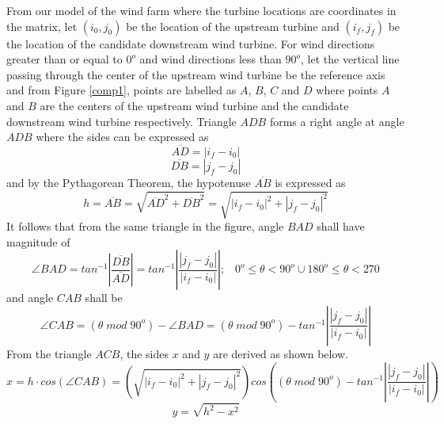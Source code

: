     From our model of the wind farm where the turbine locations are coordinates in the matrix, let $(i_0,j_0)$ be the location of the upstream turbine and $(i_f,j_f)$ be the location of the candidate downstream wind turbine. For wind directions greater than or equal to $0^o$ and wind directions less than $90^o$, let the vertical line passing through the center of the upstream wind turbine be the reference axis and from Figure \ref{comp1}, points are labelled as $A$, $B$, $C$ and $D$ where points $A$ and $B$ are the centers of the upstream wind turbine and the candidate downstream wind turbine respectively. Triangle $ADB$ forms a right angle at angle $ADB$ where the sides can be expressed as
    \begin{equation}
        \overline{AD} = \left| i_f-i_0 \right|
    \end{equation}
    \begin{equation}
        \overline{DB} = \left| j_f-j_0 \right|
    \end{equation}
    and by the Pythagorean Theorem, the hypotenuse $\overline{AB}$ is expressed as
    \begin{equation}
        h=\overline{AB} = \sqrt{\overline{AD}^2+\overline{DB}^2}=
                        \sqrt{\left| i_f-i_0 \right|^2+\left| j_f-j_0 \right|^2}
    \end{equation}
    It follows that from the same triangle in the figure, angle $BAD$ shall have magnitude of
    \begin{equation}
        \angle BAD = tan^{-1}\left| \frac{\overline{DB}}{\overline{AD}} \right|
                    = tan^{-1}\left| \frac{\left| j_f-j_0 \right|}{\left| i_f-i_0 \right|} \right|;
                    \;\;\; 0^o\leq\theta<90^o\cup180^o\leq\theta<270
    \end{equation}
    and angle $CAB$ shall be
    \begin{equation}
        \angle CAB = \left( \theta \;mod\; 90^o \right)-\angle BAD
                    = \left( \theta \;mod\; 90^o \right)-tan^{-1}\left| \frac{\left| j_f-j_0 \right|}{\left| i_f-i_0 \right|} \right|
    \end{equation}
    From the triangle $ACB$, the sides $x$ and $y$ are derived as shown below.
    \begin{equation} \label{x1}
        x=h\cdot cos\left( \angle CAB \right)=\left(\sqrt{\left| i_f-i_0 \right|^2+\left| j_f-j_0 \right|^2}\right)cos\left( \left( \theta \;mod\; 90^o \right)-tan^{-1}\left| \frac{\left| j_f-j_0 \right|}{\left| i_f-i_0 \right|} \right| \right)
    \end{equation}
    \begin{equation}\label{yValue}
        y = \sqrt{h^2-x^2}
    \end{equation}
    
